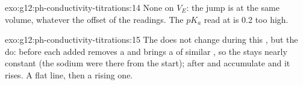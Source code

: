 \begin{solution}{exo:g12:ph-conductivity-titrations:14}
None on $V_E$: the jump is at the same volume, whatever the offset of the
readings. The $pK_a$ read at  is 0.2 too high.
\end{solution}

\begin{solution}{exo:g12:ph-conductivity-titrations:15}
The  does not change during this , but the  do:
before  each  added removes a  and brings a
 of similar , so the  stays nearly
constant (the sodium  were there from the start); after   and 
accumulate and it rises. A flat line, then a rising one.
\end{solution}

